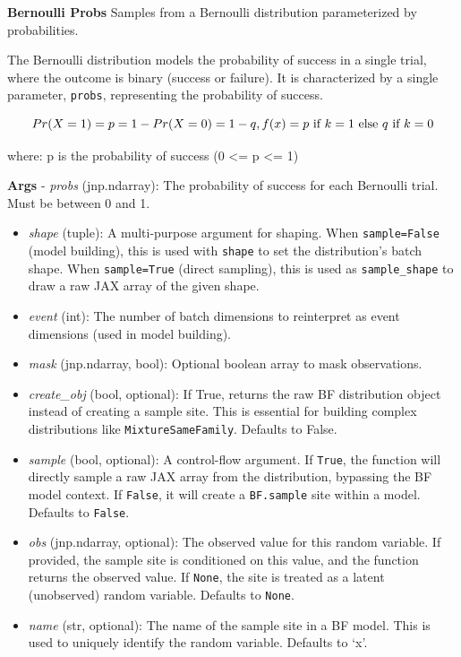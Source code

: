 \documentclass[
  letterpaper,
  DIV=11,
  numbers=noendperiod]{scrartcl}
\begin{document}
\textbf{Bernoulli Probs} Samples from a Bernoulli distribution
parameterized by probabilities.

The Bernoulli distribution models the probability of success in a single
trial, where the outcome is binary (success or failure). It is
characterized by a single parameter, \texttt{probs}, representing the
probability of success.

\[
Pr(X=1) = p = 1- Pr(X=0) = 1 - q, \\
f(x)=p \text{ if } k = 1 \text{ else } q \text{ if } k = 0
\]

where: p is the probability of success (0 \textless= p \textless= 1)

\textbf{Args} - \emph{probs} (jnp.ndarray): The probability of success
for each Bernoulli trial. Must be between 0 and 1.

\begin{itemize}
\item
  \emph{shape} (tuple): A multi-purpose argument for shaping. When
  \texttt{sample=False} (model building), this is used with
  \texttt{shape} to set the distribution's batch shape. When
  \texttt{sample=True} (direct sampling), this is used as
  \texttt{sample\_shape} to draw a raw JAX array of the given shape.
\item
  \emph{event} (int): The number of batch dimensions to reinterpret as
  event dimensions (used in model building).
\item
  \emph{mask} (jnp.ndarray, bool): Optional boolean array to mask
  observations.
\item
  \emph{create\_obj} (bool, optional): If True, returns the raw BF
  distribution object instead of creating a sample site. This is
  essential for building complex distributions like
  \texttt{MixtureSameFamily}. Defaults to False.
\item
  \emph{sample} (bool, optional): A control-flow argument. If
  \texttt{True}, the function will directly sample a raw JAX array from
  the distribution, bypassing the BF model context. If \texttt{False},
  it will create a \texttt{BF.sample} site within a model. Defaults to
  \texttt{False}.
\item
  \emph{obs} (jnp.ndarray, optional): The observed value for this random
  variable. If provided, the sample site is conditioned on this value,
  and the function returns the observed value. If \texttt{None}, the
  site is treated as a latent (unobserved) random variable. Defaults to
  \texttt{None}.
\item
  \emph{name} (str, optional): The name of the sample site in a BF
  model. This is used to uniquely identify the random variable. Defaults
  to `x'.
\end{itemize}
\end{document}

